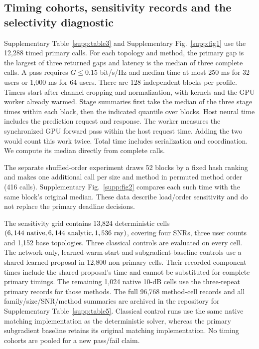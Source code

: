 \subsection{Timing cohorts, sensitivity records and the selectivity diagnostic}
Supplementary Table~\ref{supp:table3} and Supplementary Fig.~\ref{supp:fig1} use the 12,288 timed
primary calls. For each topology and method, the primary gap is the
largest of three returned gaps and latency is the median of three
complete calls. A pass requires \(G\le0.15\) bit/s/Hz and median time
at most 250 ms for 32 users or 1,000 ms for 64 users.
There are 128 independent blocks per profile. Timers start after channel
cropping and normalization, with kernels and the GPU worker already warmed.
Stage summaries first take
the median of the three stage times within each block, then the indicated
quantile over blocks. Host neural time includes the prediction request
and response. The worker measures the synchronized GPU forward pass within the host request time. Adding the two would count this work twice. Total time includes serialization and coordination. We compute its median directly from complete calls.

The separate shuffled-order experiment draws 52 blocks by a fixed hash
ranking and makes one additional call per size and method in permuted
method order (416 calls). Supplementary Fig.~\ref{supp:fig2} compares each such time
with the same block's original median. These data describe load/order
sensitivity and do not replace the primary deadline decisions.

The sensitivity grid contains 13,824 deterministic cells
\((6,144\ {\rm native},6,144\ {\rm analytic},1,536\ {\rm ray})\),
covering four SNRs, three user counts and 1,152 base topologies.
Three classical controls are evaluated on every cell.
The network-only, learned-warm-start and subgradient-baseline controls use a shared learned
proposal in 12,800 non-primary cells. Their recorded component times include
the shared proposal's time and cannot be substituted for complete primary
timings. The remaining 1,024 native 10-dB cells use the three-repeat
primary records for those methods. The full 96,768 method-cell records
and all family/size/SNR/method summaries are archived in the repository for
Supplementary Table~\ref{supp:table5}. Classical control runs use the same native
matching implementation as the deterministic solver, whereas the primary
subgradient baseline retains its original matching implementation.
No timing cohorts are pooled for a new pass/fail claim.

